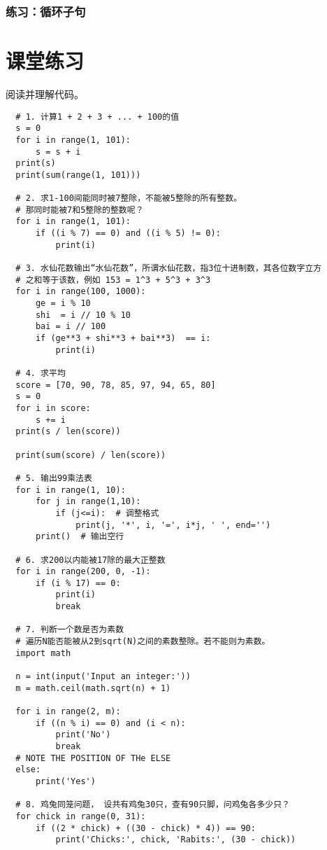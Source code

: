 \subsubsection{练习：循环子句}

\section{课堂练习}
阅读并理解代码。
\begin{framed}
\begin{verbatim}
  # 1. 计算1 + 2 + 3 + ... + 100的值
  s = 0
  for i in range(1, 101):
      s = s + i
  print(s)
  print(sum(range(1, 101)))

  # 2. 求1-100间能同时被7整除，不能被5整除的所有整数。
  # 那同时能被7和5整除的整数呢？
  for i in range(1, 101):
      if ((i % 7) == 0) and ((i % 5) != 0):
          print(i)

  # 3. 水仙花数输出“水仙花数”，所谓水仙花数，指3位十进制数，其各位数字立方
  # 之和等于该数，例如 153 = 1^3 + 5^3 + 3^3
  for i in range(100, 1000):
      ge = i % 10
      shi  = i // 10 % 10
      bai = i // 100
      if (ge**3 + shi**3 + bai**3)  == i:
          print(i)

  # 4. 求平均
  score = [70, 90, 78, 85, 97, 94, 65, 80]
  s = 0
  for i in score:
      s += i
  print(s / len(score))

  print(sum(score) / len(score))

  # 5. 输出99乘法表
  for i in range(1, 10):
      for j in range(1,10):
          if (j<=i):  # 调整格式
              print(j, '*', i, '=', i*j, ' ', end='')
      print()  # 输出空行

  # 6. 求200以内能被17除的最大正整数
  for i in range(200, 0, -1):
      if (i % 17) == 0:
          print(i)
          break

  # 7. 判断一个数是否为素数
  # 遍历N能否能被从2到sqrt(N)之间的素数整除。若不能则为素数。
  import math
  
  n = int(input('Input an integer:'))
  m = math.ceil(math.sqrt(n) + 1)

  for i in range(2, m):
      if ((n % i) == 0) and (i < n):
          print('No')
          break
  # NOTE THE POSITION OF THe ELSE
  else:  
      print('Yes')

  # 8. 鸡兔同笼问题， 设共有鸡兔30只，查有90只脚，问鸡兔各多少只？
  for chick in range(0, 31):
      if ((2 * chick) + ((30 - chick) * 4)) == 90:
          print('Chicks:', chick, 'Rabits:', (30 - chick))
\end{verbatim}
\end{framed}

